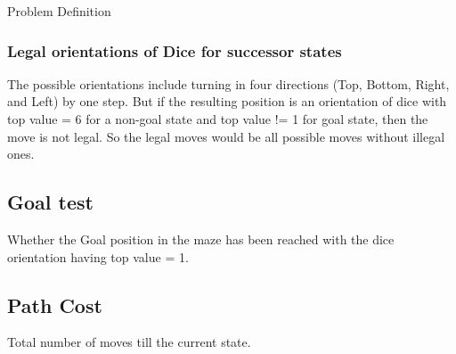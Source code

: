 \documentclass[12pt]{article}
\begin{document}
\begin{section}{Problem Definition}
\subsubsection{Legal orientations of Dice for successor states}
The possible orientations include turning in four directions (Top, Bottom, Right, and Left) by one step. But if the resulting position is an orientation of dice with top value = 6 for a non-goal state and top value != 1 for goal state, then the move is not legal. So the legal moves would be all possible moves without illegal ones.

\subsection{Goal test}
Whether the Goal position in the maze has been reached with the dice orientation having top value = 1. 
\subsection{Path Cost}
Total number of moves till the current state.



\end{section}
\end{document}
